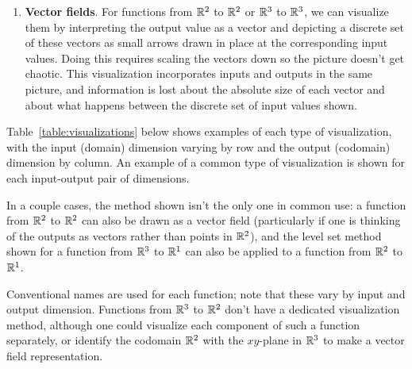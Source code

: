 \documentclass{watsonbook}
\begin{document}
\begin{tcolorbox}[title = Function Visualization Methods, colback =
  softblue, colframe = MidnightBlue]
\begin{enumerate}[leftmargin = 12pt, itemsep = 6pt, parsep = 6pt]
    The trace is drawn entirely on the codomain side, which means that
    this visualization lacks information about which $t$ value or
    values mapped to each highlighted point.

  \item \textbf{Vector fields}. For functions from $\mathbb{R}^2$ to $\mathbb{R}^2$ or
    $\mathbb{R}^3$ to $\mathbb{R}^3$, we can visualize them by interpreting the output
    value as a vector and depicting a discrete set of these vectors as small
    arrows drawn in place at the corresponding input values. Doing this
    requires scaling the vectors down so the picture doesn't get
    chaotic. This visualization incorporates inputs and outputs in the
    same picture, and information is lost about the absolute size
    of each vector and about what happens between the discrete set of
    input values shown. 
  \end{enumerate}
\end{tcolorbox}

Table~\ref{table:visualizations} below shows examples of each type of
visualization, with the input (domain) dimension varying by row and
the output (codomain) dimension by column. An example of a common type
of visualization is shown for each input-output pair of dimensions.

In a couple cases, the method shown isn't the only one in common use:
a function from $\mathbb{R}^2$ to $\mathbb{R}^2$ can also be drawn as a vector field
(particularly if one is thinking of the outputs as vectors rather than
points in $\mathbb{R}^2$), and the level set method shown for a function from
$\mathbb{R}^3$ to $\mathbb{R}^1$ can also be applied to a function from $\mathbb{R}^2$ to
$\mathbb{R}^1$.

Conventional names are used for each function; note that these vary by
input and output dimension. Functions from $\mathbb{R}^3$ to $\mathbb{R}^2$ don't have
a dedicated visualization method, although one could visualize each
component of such a function separately, or identify the codomain
$\mathbb{R}^2$ with the $xy$-plane in $\mathbb{R}^3$ to make a vector field
representation.

\end{document}
